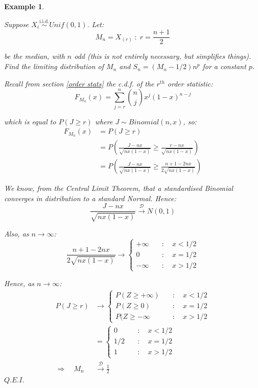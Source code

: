 \documentclass[12pt,a4paper]{article}
\newtheorem{ex}[thm]{Example}
\begin{document}
\begin{ex}$\;$\par\vspace{1cm}

Suppose $X_i \overset{\text{i.i.d.}}{\sim} Unif(0,1)$. Let:
$$M_n = X_{(r)}\; :\; r=\frac{n+1}{2}$$

be the median, with $n$ odd (this is not entirely necessary, but simplifies things). Find the limiting distribution of $M_n$ and $S_n = (M_n - 1/2)n^p$ for a constant $p$.\par\vspace{1cm}

Recall from section \ref{order stats} the c.d.f. of the $r^{th}$ order statistic:
$$F_{M_n}(x) = \sum_{j=r}^n \binom{n}{j}x^j (1-x)^{n-j}$$

which is equal to $P(J\geq r)$ where $J\sim Binomial(n,x)$, so:
\begin{align*}
F_{M_n}(x) &= P(J\geq r)\\
&= P\left(\frac{J-nx}{\sqrt{nx(1-x)}} \geq \frac{r-nx}{\sqrt{nx(1-x)}}\right)\\
&= P\left(\frac{J-nx}{\sqrt{nx(1-x)}} \geq \frac{n+1-2nx}{2\sqrt{nx(1-x)}}\right)
\end{align*}

We know, from the Central Limit Theorem, that a standardised Binomial converges in distribution to a standard Normal. Hence:
$$\frac{J-nx}{\sqrt{nx(1-x)}} \xrightarrow{\mathscr{D}} N(0,1)$$

Also, as $n\to\infty$:
$$\frac{n+1-2nx}{2\sqrt{nx(1-x)}} \rightarrow \left\{\begin{array}{cc} +\infty \quad&:\quad x<1/2\\ 0\quad&:\quad x=1/2\\-\infty\quad&:\quad x>1/2\end{array}\right.$$

Hence, as $n\to\infty$:
\begin{align*}
P(J\geq r) &\to \left\{\begin{array}{cc} P(Z\geq +\infty)\quad&:\quad x<1/2\\ P(Z \geq 0)\quad&:\quad x=1/2\\ P(Z\geq -\infty\quad&:\quad x>1/2\end{array}\right.\\
&= \left\{\begin{array}{cc} 0\quad&:\quad x<1/2\\ 1/2\quad&:\quad x=1/2\\ 1\quad&:\quad x>1/2\end{array}\right.\\
\Rightarrow\quad M_n &\xrightarrow{\mathscr{D}} \frac{1}{2}
\end{align*}\hfill$Q.E.I.$


\end{ex}
\end{document}
